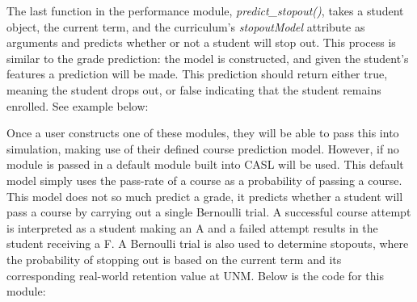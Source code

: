 \documentclass[botnum, fleqn]{unmeethesis}
\begin{document}
      

      The last function in the performance module, \textit{predict\_stopout()}, takes a student object, the current term, and the curriculum's \textit{stopoutModel} attribute as arguments and predicts whether or not a student will stop out. This process is similar to the grade prediction: the model is constructed, and given the student's features a prediction will be made. This prediction should return either true, meaning the student drops out, or false indicating that the student remains enrolled. See example below:

      

      Once a user constructs one of these modules, they will be able to pass this into simulation, making use of their defined course prediction model. However, if no module is passed in a default module built into CASL will be used. This default model simply uses the pass-rate of a course as a probability of passing a course. This model does not so much predict a grade, it predicts whether a student will pass a course by carrying out a single Bernoulli trial. A successful course attempt is interpreted as a student making an A and a failed attempt results in the student receiving a F. A Bernoulli trial is also used to determine stopouts, where the probability of stopping out is based on the current term and its corresponding real-world retention value at UNM. Below is the code for this module:

      
  
\end{document}
